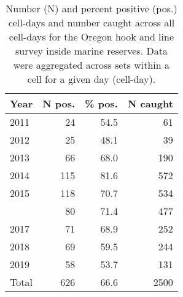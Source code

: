 
\begin{longtable}[t]{lrrr}
\caption{\label{tab:fi-index-ormarres-N}Number (N) and percent positive (pos.) cell-days and number caught across all cell-days for the Oregon hook and line survey inside marine reserves. Data were aggregated across sets within a cell for a given day (cell-day).}\\
\toprule
Year & N pos. & \% pos. & N caught\\
\midrule
2011 & 24 & 54.5 & 61\\
2012 & 25 & 48.1 & 39\\
2013 & 66 & 68.0 & 190\\
2014 & 115 & 81.6 & 572\\
2015 & 118 & 70.7 & 534\\
\addlinespace
2016 & 80 & 71.4 & 477\\
2017 & 71 & 68.9 & 252\\
2018 & 69 & 59.5 & 244\\
2019 & 58 & 53.7 & 131\\
Total & 626 & 66.6 & 2500\\
\bottomrule
\end{longtable}
